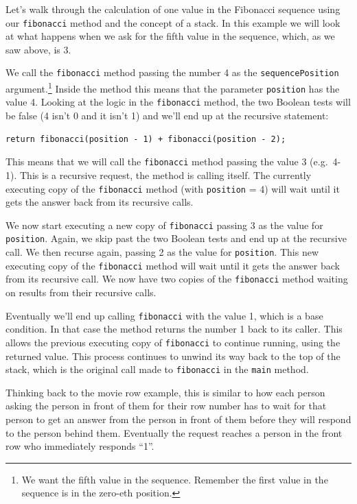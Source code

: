 Let's walk through the calculation of one value in the Fibonacci sequence using our \texttt{fibonacci} method and the concept of a stack. In this example we will look at what happens when we ask for the fifth value in the sequence, which, as we saw above, is 3.

We call the \texttt{fibonacci} method passing the number 4 as the \texttt{sequencePosition} argument.\footnote{We want the fifth value in the sequence. Remember the first value in the sequence is in the zero-eth position.} Inside the method this means that the parameter \texttt{position} has the value 4. Looking at the logic in the \texttt{fibonacci} method, the two Boolean tests will be false (4 isn't 0 and it isn't 1) and we'll end up at the recursive statement:

\beforeverb
\begin{verbatim}
return fibonacci(position - 1) + fibonacci(position - 2);
\end{verbatim}
\afterverb

This means that we will call the \texttt{fibonacci} method passing the value 3 \mbox{(e.g. 4-1)}. This is a recursive request, the method is calling itself. The currently executing copy of the \texttt{fibonacci} method (with \texttt{position} = 4) will wait until it gets the answer back from its recursive calls.

We now start executing a new copy of \texttt{fibonacci} passing 3 as the value for \texttt{position}. Again, we skip past the two Boolean tests and end up at the recursive call. We then recurse again, passing 2 as the value for \texttt{position}. This new executing copy of the \texttt{fibonacci} method will wait until it gets the answer back from its recursive call. We now have two copies of the \texttt{fibonacci} method waiting on results from their recursive calls.

Eventually we'll end up calling \texttt{fibonacci} with the value 1, which is a base condition. In that case the method returns the number 1 back to its caller. This allows the previous executing copy of \texttt{fibonacci} to continue running, using the returned value. This process continues to unwind its way back to the top of the stack, which is the original call made to \texttt{fibonacci} in the \texttt{main} method.

Thinking back to the movie row example, this is similar to how each person asking the person in front of them for their row number has to wait for that person to get an answer from the person in front of them before they will respond to the person behind them. Eventually the request reaches a person in the front row who immediately responds ``1''.

